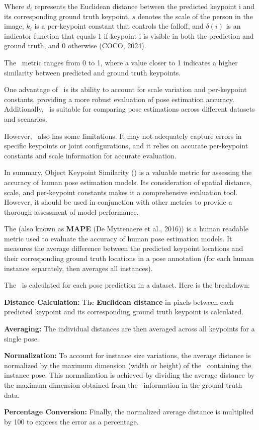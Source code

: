 Where $ d_i $ represents the Euclidean distance between the predicted keypoint i and its corresponding ground truth keypoint, $ s $ denotes the scale of the person in the image, $ k_i $ is a per-keypoint constant that controls the falloff, and $ \delta(i) $ is an indicator function that equals 1 if keypoint i is visible in both the prediction and ground truth, and 0 otherwise (\scc COCO, 2024).

The \OKS\ metric ranges from 0 to 1, where a value closer to 1 indicates a higher similarity between predicted and ground truth keypoints.

One advantage of \OKS\ is its ability to account for scale variation and per-keypoint constants, providing a more robust evaluation of pose estimation accuracy. Additionally, \OKS\ is suitable for comparing pose estimations across different datasets and scenarios.

However, \OKS\ also has some limitations. It may not adequately capture errors in specific keypoints or joint configurations, and it relies on accurate per-keypoint constants and scale information for accurate evaluation.

In summary, Object Keypoint Similarity (\OKS) is a valuable metric for assessing the accuracy of human pose estimation models. Its consideration of spatial distance, scale, and per-keypoint constants makes it a comprehensive evaluation tool. However, it should be used in conjunction with other metrics to provide a thorough assessment of model performance.

The {\bf \APE} (also known as {\bf MAPE} (\scc De Myttenaere et al., 2016)) is a human readable metric used to evaluate the accuracy of human pose estimation models. It measures the average difference between the predicted keypoint locations and their corresponding ground truth locations in a pose annotation (for each human instance separately, then averages all instances).

The \APE\ is calculated for each pose prediction in a dataset. Here is the breakdown:

\startitemize[n]
    \item {\bf Distance Calculation:} The {\bf Euclidean distance} in pixels between each predicted keypoint and its corresponding ground truth keypoint is calculated.
    \item {\bf Averaging:} The individual distances are then averaged across all keypoints for a single pose.
    \item {\bf Normalization:} To account for instance size variations, the average distance is normalized by the maximum dimension (width or height) of the \BBOX\ containing the instance pose. This normalization is achieved by dividing the average distance by the maximum dimension obtained from the \BBOX\ information in the ground truth data.
    \item {\bf Percentage Conversion:} Finally, the normalized average distance is multiplied by 100 to express the error as a percentage.
\stopitemize

